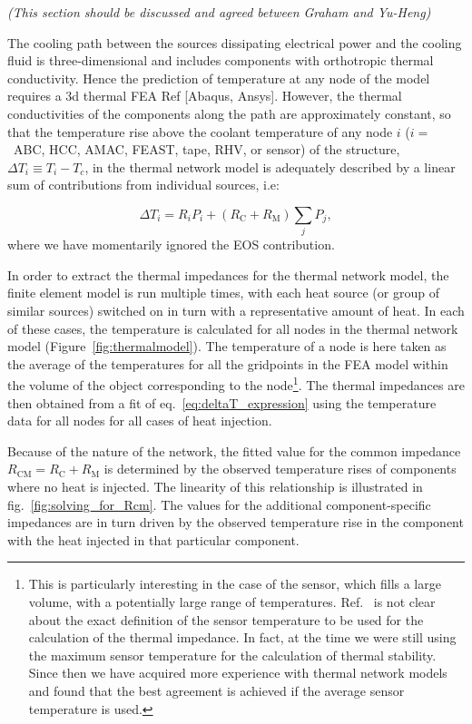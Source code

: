 \textit{(This section should be discussed and agreed between Graham and Yu-Heng)}

The cooling path between the sources dissipating electrical power and the cooling fluid is three-dimensional and includes components with orthotropic thermal conductivity. Hence the prediction of temperature at any node of the model requires a 3d thermal FEA Ref [Abaqus, Ansys]. However, the thermal conductivities of the components along the path are approximately constant, so that the temperature rise above the coolant temperature of any node $i$ ($i=$~ABC, HCC, AMAC, FEAST, tape, RHV, or sensor) of the structure, \mbox{$\Delta T_i \equiv T_i - T_c$,} in the thermal network model is adequately described by a linear sum of contributions from individual sources, i.e:

\begin{equation}
\Delta T_i = R_i P_i + \left(R_\text{C} + R_\text{M}\right)\sum_j P_j, 
\label{eq:deltaT_expression}
\end{equation}
where we have momentarily ignored the EOS contribution.

In order to extract the thermal impedances for the thermal network model, the finite element model is run multiple times, with each heat source (or group of similar sources) switched on in turn with a representative amount of heat. In each of these cases, the temperature is calculated for all nodes in the thermal network model (Figure~\ref{fig:thermalmodel}). The temperature of a node is here taken as the average of the temperatures for all the gridpoints in the FEA model within the volume of the object corresponding to the node\footnote{This is particularly interesting in the case of the sensor, which fills a large volume, with a potentially large range of temperatures. Ref.~\cite{Beck:2010zzd} is not clear about the exact definition of the sensor temperature to be used for the calculation of the thermal impedance. In fact, at the time we were still using the maximum sensor temperature for the calculation of thermal stability. Since then we have acquired more experience with thermal network models and found that the best agreement is achieved if the average sensor temperature is used.}. The thermal impedances are then obtained from a fit of eq.~\ref{eq:deltaT_expression} using the temperature data for all nodes for all cases of heat injection.

Because of the nature of the network, the fitted value for the common impedance $R_\text{CM}=R_\text{C} + R_\text{M}$ is determined by the observed temperature rises of components where no heat is injected. The linearity of this relationship is illustrated in fig.~\ref{fig:solving_for_Rcm}. The values for the additional component-specific impedances are in turn driven by the observed temperature rise in the component with the heat injected in that particular component.


